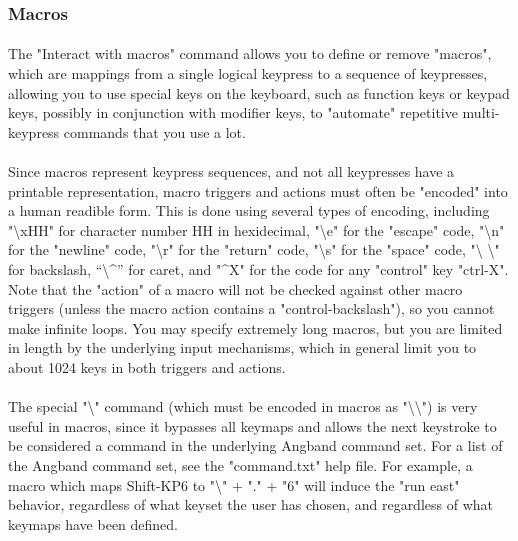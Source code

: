 \subsubsection{Macros}
\paragraph{}The "Interact with macros" command allows you to define or remove
"macros", which are mappings from a single logical keypress to a sequence
of keypresses, allowing you to use special keys on the keyboard, such as
function keys or keypad keys, possibly in conjunction with modifier keys,
to "automate" repetitive multi-keypress commands that you use a lot.

\paragraph{}Since macros represent keypress sequences, and not all
keypresses have a printable representation, macro triggers and actions
must often be "encoded" into a human readible form. This is done using
several types of encoding, including "\textbackslash xHH" for character
number HH in hexidecimal, "\textbackslash e" for the "escape" code,
"\textbackslash n" for the "newline" code, "\textbackslash r" for the
"return" code, "\textbackslash s" for the "space" code, "\textbackslash
\textbackslash " for backslash, ``\textbackslash \^{}'' for caret, and
"\^{}X" for the code for any "control" key "ctrl-X". Note that the
"action" of a macro will not be checked against other macro triggers
(unless the macro action contains a "control-backslash"), so you cannot
make infinite loops. You may specify extremely long macros, but you are
limited in length by the underlying input mechanisms, which in general
limit you to about 1024 keys in both triggers and actions.

\paragraph{}The special "\textbackslash " command (which must be encoded
in macros as "\textbackslash \textbackslash ") is very useful in macros, since it bypasses all
keymaps and allows the next keystroke to be considered a command in the
underlying Angband command set.  For a list of the Angband command set,
see the "command.txt" help file.  For example, a macro which maps
Shift-KP6 to "\textbackslash " + "." + "6" will induce the "run east"
behavior, regardless of what keyset the user has chosen, and regardless
of what keymaps have been defined.

